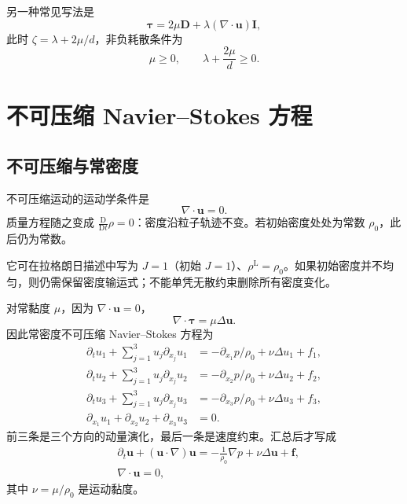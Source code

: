 \documentclass[cn,hazy,blue,11pt,normal]{elegantnote}
\numberwithin{equation}{section}
\newcommand{\Dt}{\frac{\mathrm D}{\mathrm Dt}}
\newcommand{\vct}[1]{\bm{#1}}
\newcommand{\ten}[1]{\bm{#1}}
\begin{document}
另一种常见写法是
\begin{equation}
 \ten\tau=2\mu\ten D+\lambda(\nabla\cdot\vct u)\ten I,
\end{equation}
此时 $\zeta=\lambda+2\mu/d$，非负耗散条件为
\begin{equation}
 \mu\ge0,\qquad \lambda+\frac{2\mu}{d}\ge0.
\end{equation}









\section{不可压缩 Navier--Stokes 方程}\label{sec:incompressible-details}

\subsection{不可压缩与常密度}

不可压缩运动的运动学条件是
\begin{equation}
 \boxed{\nabla\cdot\vct u=0.}
\end{equation}
质量方程随之变成 $\Dt\rho=0$：密度沿粒子轨迹不变。若初始密度处处为常数 $\rho_0$，此后仍为常数。

它可在拉格朗日描述中写为 $J=1$（初始 $J=1$）、$\rho^{\mathrm L}=\rho_0$。如果初始密度并不均匀，则仍需保留密度输运式；不能单凭无散约束删除所有密度变化。

对常黏度 $\mu$，因为 $\nabla\cdot\vct u=0$，
\begin{equation}
 \nabla\cdot\ten\tau=\mu\Delta\vct u.
\end{equation}
因此常密度不可压缩 Navier--Stokes 方程为
\begin{align}
 \partial_tu_1+\sum_{j=1}^3u_j\partial_{x_j}u_1
 &=-\partial_{x_1}p/\rho_0+\nu\Delta u_1+f_1,\\
 \partial_tu_2+\sum_{j=1}^3u_j\partial_{x_j}u_2
 &=-\partial_{x_2}p/\rho_0+\nu\Delta u_2+f_2,\\
 \partial_tu_3+\sum_{j=1}^3u_j\partial_{x_j}u_3
 &=-\partial_{x_3}p/\rho_0+\nu\Delta u_3+f_3,\\
 \partial_{x_1}u_1+\partial_{x_2}u_2+\partial_{x_3}u_3&=0.
\end{align}
前三条是三个方向的动量演化，最后一条是速度约束。汇总后才写成
\begin{equation}
 \boxed{
 \begin{aligned}
  &\partial_t\vct u+(\vct u\cdot\nabla)\vct u
  =-\frac1{\rho_0}\nabla p+\nu\Delta\vct u+\vct f,\\
  &\nabla\cdot\vct u=0,
 \end{aligned}} \label{eq:ins}
\end{equation}
其中 $\nu=\mu/\rho_0$ 是运动黏度。
\end{document}
